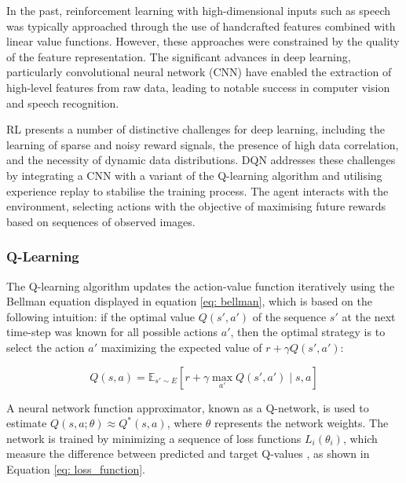In the past, reinforcement learning with high-dimensional inputs such as speech was typically approached through the use of handcrafted features combined with linear value functions. However, these approaches were constrained by the quality of the feature representation. The significant advances in deep learning, particularly convolutional neural network (CNN) have enabled the extraction of high-level features from raw data, leading to notable success in computer vision and speech recognition. \cite{mnih2013playingatarideepreinforcement}

RL presents a number of distinctive challenges for deep learning, including the learning of sparse and noisy reward signals, the presence of high data correlation, and the necessity of dynamic data distributions. DQN addresses these challenges by integrating a CNN with a variant of the Q-learning algorithm and utilising experience replay to stabilise the training process. The agent interacts with the environment, selecting actions with the objective of maximising future rewards based on sequences of observed images. \cite{mnih2013playingatarideepreinforcement}

\subsubsection{Q-Learning} %
The Q-learning algorithm updates the action-value function iteratively using the Bellman equation displayed in equation \ref{eq: bellman}, which is based on the following intuition: if the optimal value $Q(s', a')$ of the sequence $s'$ at the next time-step was known for all possible actions $a'$, then the optimal strategy is to select the action $a'$ maximizing the expected value of $r + \gamma Q(s', a')$: \cite{mnih2013playingatarideepreinforcement}

\begin{equation} \label{eq: bellman}
    Q(s, a) = \mathbb{E}_{s' \sim E} \left[ r + \gamma \max_{a'} Q(s', a') \mid s, a \right]
\end{equation}

A neural network function approximator, known as a Q-network, is used to estimate $Q(s, a; \theta) \approx Q^*(s, a)$, where $\theta$ represents the network weights. The network is trained by minimizing a sequence of loss functions $L_i(\theta_i)$, which measure the difference between predicted and target Q-values \cite{mnih2013playingatarideepreinforcement}, as shown in Equation \ref{eq: loss_function}.

